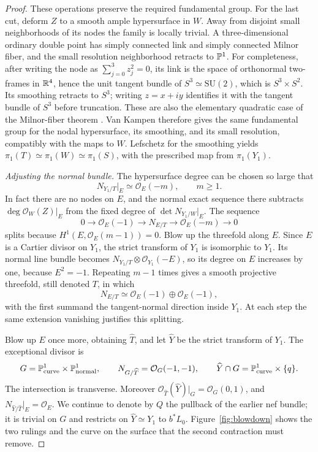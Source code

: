 \begin{proof}
These operations preserve the required fundamental group.  For the
last cut, deform $Z$ to a smooth ample hypersurface in $W$.  Away from
disjoint small neighborhoods of its nodes the family is locally
trivial.  A three-dimensional ordinary double point has simply
connected link and simply connected Milnor fiber, and the small
resolution neighborhood retracts to $\mathbb P^1$.  For completeness, after
writing the node as $\sum_{j=0}^3 z_j^2=0$, its link is the space of
orthonormal two-frames in $\mathbb R^4$, hence the unit tangent bundle of
$S^3\simeq\mathrm{SU}(2)$, which is $S^3\times S^2$.  Its smoothing
retracts to $S^3$; writing $z=x+iy$ identifies it with the tangent
bundle of $S^3$ before truncation.  These are also the elementary
quadratic case of the Milnor-fiber theorem \cite{MilnorSingular}.
Van Kampen therefore gives the same fundamental group for the nodal
hypersurface, its smoothing, and its small resolution, compatibly with
the maps to $W$.  Lefschetz for the smoothing yields
$\pi_1(T)\simeq\pi_1(W)\simeq\pi_1(S)$, with the prescribed map
from $\pi_1(Y_1)$.

\smallskip
\noindent\emph{Adjusting the normal bundle.}
The hypersurface degree can be chosen so large that
\[
 N_{Y_1/T}|_E\simeq\mathcal O_E(-m),\qquad m\ge1.
\]
In fact there are no nodes on $E$, and the normal exact sequence there
subtracts $\deg\mathcal O_W(Z)|_E$ from the fixed degree of
$\det N_{Y_1/W}|_E$.  The sequence
\[
 0\longrightarrow\mathcal O_E(-1)
 \longrightarrow N_{E/T}
 \longrightarrow\mathcal O_E(-m)\longrightarrow0
\]
splits because
$H^1(E,\mathcal O_E(m-1))=0$.  Blow up the threefold along $E$.
Since $E$ is a Cartier divisor on $Y_1$, the strict transform of $Y_1$
is isomorphic to $Y_1$.  Its normal line bundle becomes
$N_{Y_1/T}\otimes\mathcal O_{Y_1}(-E)$, so its degree on $E$ increases
by one, because $E^2=-1$.  Repeating $m-1$ times gives a smooth
projective threefold, still denoted $T$, in which
\[
 N_{E/T}\simeq\mathcal O_E(-1)\oplus\mathcal O_E(-1),
\]
with the first summand the tangent-normal direction inside $Y_1$.
At each step the same extension vanishing justifies this splitting.

Blow up $E$ once more, obtaining $\widehat T$, and let $\widehat Y$
be the strict transform of $Y_1$.  The exceptional divisor is
\begin{equation}\label{proj:exceptional-quadric}
 G=\mathbb P^1_{\mathrm{curve}}\times\mathbb P^1_{\mathrm{normal}},\qquad
 N_{G/\widehat T}=\mathcal O_G(-1,-1),\qquad
 \widehat Y\cap G=\mathbb P^1_{\mathrm{curve}}\times\{q\}.
\end{equation}
The intersection is transverse.  Moreover
$\mathcal O_{\widehat T}(\widehat Y)|_G=\mathcal O_G(0,1)$, and
$N_{\widehat Y/\widehat T}|_E=\mathcal O_E$.
We continue to denote by $Q$ the pullback of the earlier nef bundle;
it is trivial on $G$ and restricts on $\widehat Y\simeq Y_1$ to
$b^*L_0$.  Figure~\ref{fig:blowdown} shows the two rulings and the
curve on the surface that the second contraction must remove.


\end{proof}
